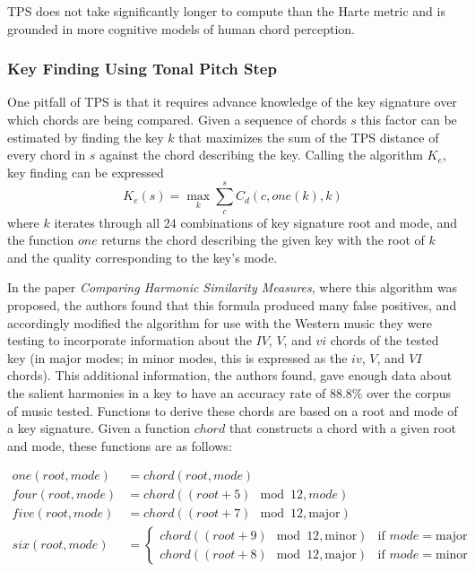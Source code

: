 TPS does not take significantly longer to compute than the Harte metric and is grounded in more cognitive models of human chord perception.

\subsubsection{Key Finding Using Tonal Pitch Step}

One pitfall of TPS is that it requires advance knowledge of the key signature over which chords are being compared. Given a sequence of chords $s$ this factor can be estimated by finding the key $k$ that maximizes the sum of the TPS distance of every chord in $s$ against the chord describing the key. Calling the algorithm $K_e$, key finding can be expressed \[ K_e(s) = \max_k \sum_c^s C_d(c,one(k),k) \] where $k$ iterates through all 24 combinations of key signature root and mode, and the function $one$ returns the chord describing the given key with the root of $k$ and the quality corresponding to the key's mode.

In the paper \textit{Comparing Harmonic Similarity Measures}\cite{de2010comparing}, where this algorithm was proposed, the authors found that this formula produced many false positives, and accordingly modified the algorithm for use with the Western music they were testing to incorporate information about the $IV$, $V$, and $vi$ chords of the tested key (in major modes; in minor modes, this is expressed as the $iv$, $V$, and $VI$ chords). This additional information, the authors found, gave enough data about the salient harmonies in a key to have an accuracy rate of $88.8\%$ over the corpus of music tested. Functions to derive these chords are based on a root and mode of a key signature. Given a function $chord$ that constructs a chord with a given root and mode, these functions are as follows:

\begin{align*}
one(root,mode)  &= chord(root,mode) \\
four(root,mode) &= chord((root+5) \mod 12, mode) \\
five(root,mode) &= chord((root+7) \mod 12, \text{major}) \\
six(root,mode) &= \begin{cases} chord((root+9) \mod 12, \text{minor}) &\text{if }mode = \text{major} \\ chord((root+8) \mod 12, \text{major}) &\text{if }mode = \text{minor} \end{cases} \\
\end{align*}

